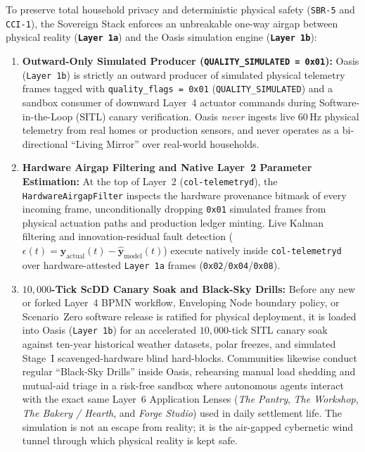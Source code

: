 To preserve total household privacy and deterministic physical safety (\texttt{SBR-5} and \texttt{CCI-1}), the Sovereign Stack enforces an unbreakable one-way airgap between physical reality (\textbf{\texttt{Layer 1a}}) and the Oasis simulation engine (\textbf{\texttt{Layer 1b}}):
\begin{enumerate}
    \item \textbf{Outward-Only Simulated Producer (\texttt{QUALITY\_SIMULATED = 0x01}):} Oasis (\texttt{Layer 1b}) is strictly an outward producer of simulated physical telemetry frames tagged with \texttt{quality\_flags = 0x01} (\texttt{QUALITY\_SIMULATED}) and a sandbox consumer of downward Layer~4 actuator commands during Software-in-the-Loop (SITL) canary verification. Oasis \textit{never} ingests live 60\,Hz physical telemetry from real homes or production sensors, and never operates as a bi-directional ``Living Mirror'' over real-world households.
    \item \textbf{Hardware Airgap Filtering and Native Layer~2 Parameter Estimation:} At the top of Layer~2 (\texttt{col-telemetryd}), the \texttt{HardwareAirgapFilter} inspects the hardware provenance bitmask of every incoming frame, unconditionally dropping \texttt{0x01} simulated frames from physical actuation paths and production ledger minting. Live Kalman filtering and innovation-residual fault detection ($\epsilon(t) = \mathbf{y}_{\mathrm{actual}}(t) - \hat{\mathbf{y}}_{\mathrm{model}}(t)$) execute natively inside \texttt{col-telemetryd} over hardware-attested \texttt{Layer 1a} frames (\texttt{0x02}/\texttt{0x04}/\texttt{0x08}).
    \item \textbf{$10{,}000$-Tick ScDD Canary Soak and Black-Sky Drills:} Before any new or forked Layer~4 BPMN workflow, Enveloping Node boundary policy, or Scenario~Zero software release is ratified for physical deployment, it is loaded into Oasis (\texttt{Layer 1b}) for an accelerated $10{,}000$-tick SITL canary soak against ten-year historical weather datasets, polar freezes, and simulated Stage~I scavenged-hardware blind hard-blocks. Communities likewise conduct regular ``Black-Sky Drills'' inside Oasis, rehearsing manual load shedding and mutual-aid triage in a risk-free sandbox where autonomous agents interact with the exact same Layer~6 Application Lenses (\textit{The Pantry}, \textit{The Workshop}, \textit{The Bakery / Hearth}, and \textit{Forge Studio}) used in daily settlement life. The simulation is not an escape from reality; it is the air-gapped cybernetic wind tunnel through which physical reality is kept safe.
\end{enumerate}
